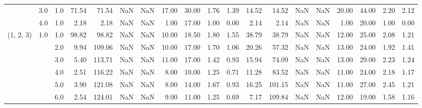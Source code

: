 \begin{tabular}{lllrrrrrrrrrrrrrrrr}
          & 3.0 & 1.0  &     71.54 &      71.54 &               NaN &                NaN & 17.00 &  30.00 &             1.76 &                         1.39 &     14.52 &      14.52 &               NaN &                NaN & 20.00 &  44.00 &             2.20 &                         2.12 \\
          & 4.0 & 1.0  &      2.18 &       2.18 &               NaN &                NaN &  1.00 &  17.00 &             1.00 &                         0.00 &      2.14 &       2.14 &               NaN &                NaN &  1.00 &  20.00 &             1.00 &                         0.00 \\
(1, 2, 3) & 1.0 & 1.0  &     98.82 &      98.82 &               NaN &                NaN & 10.00 &  18.50 &             1.80 &                         1.55 &     38.79 &      38.79 &               NaN &                NaN & 12.00 &  25.00 &             2.08 &                         1.21 \\
          &     & 2.0  &      9.94 &     109.06 &               NaN &                NaN & 10.00 &  17.00 &             1.70 &                         1.06 &     20.26 &      57.32 &               NaN &                NaN & 13.00 &  24.00 &             1.92 &                         1.41 \\
          &     & 3.0  &      5.40 &     113.71 &               NaN &                NaN & 11.00 &  17.00 &             1.42 &                         0.93 &     15.94 &      74.09 &               NaN &                NaN & 13.00 &  29.00 &             2.23 &                         1.24 \\
          &     & 4.0  &      2.51 &     116.22 &               NaN &                NaN &  8.00 &  10.00 &             1.25 &                         0.71 &     11.28 &      83.52 &               NaN &                NaN & 11.00 &  24.00 &             2.18 &                         1.17 \\
          &     & 5.0  &      3.90 &     121.08 &               NaN &                NaN &  8.00 &  14.00 &             1.67 &                         0.93 &     16.25 &     101.15 &               NaN &                NaN & 11.00 &  27.00 &             2.45 &                         1.21 \\
          &     & 6.0  &      2.54 &     124.01 &               NaN &                NaN &  9.00 &  11.00 &             1.25 &                         0.69 &      7.17 &     109.84 &               NaN &                NaN & 12.00 &  19.00 &             1.58 &                         1.16 \\

\end{tabular}
